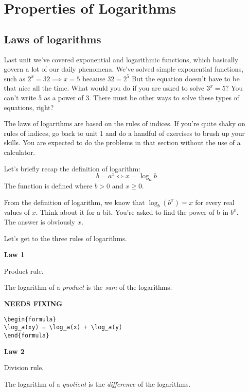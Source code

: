 \chapter{Properties of Logarithms}

\section{Laws of logarithms}
Last unit we've covered exponential and logarithmic functions, which basically govern a lot of our daily phenomena. We've solved simple exponential functions, such as $2^x=32\implies x=5$ because $32=2^5$
But the equation doesn't have to be that nice all the time. What would you do if you are asked to solve $3^x=5$? You can't write 5 as a power of 3. There must be other ways to solve these types of equations, right?

The laws of logarithms are based on the rules of indices. If you're quite shaky on rules of indices, go back to unit 1 and do a handful of exercises to brush up your skills. You are expected to do the problems in that section without the use of a calculator.

Let's briefly recap the definition of logarithm:
\[b=a^x \iff x=\log_ab\]
The function is defined where $b>0$ and $x\geq 0$.

From the definition of logarithm, we know that $\log_b(b^x)=x$ for every real values of $x$.
Think about it for a bit. You're asked to find the power of b in $b^x$. The answer is obviously $x$.

Let's get to the three rules of logarithms.

\vspace{5mm}
\par\textbf{Law 1}
\par Product rule.
\par The logarithm of a \textit{product} is the \textit{sum} of the logarithms.

{\hfill\Large\bfseries NEEDS FIXING\hfill}
\begin{lstlisting}
\begin{formula}
\log_a(xy) = \log_a(x) + \log_a(y)
\end{formula}
 \end{lstlisting}


\vspace{5mm}
\par\textbf{Law 2}
\par Division rule.
\par The logarithm of a \textit{quotient} is the \textit{difference} of the logarithms.


